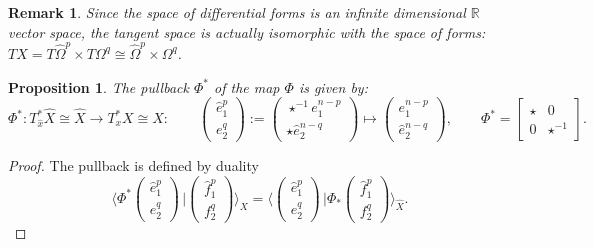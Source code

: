 \documentclass{elsarticle}
\newcommand{\revTwo}[1]{{\color{black}#1}}
\newtheorem{remark}{Remark}
\newtheorem{proposition}{Proposition}
\newcommand{\bbR}{\mathbb{R}}
\newcommand*{\dual}[1]{\ensuremath{\widehat{#1}}}
\newcommand{\dualpr}[3][]{\ensuremath{\langle #2 \, \vert #3 \rangle_{#1}}}
\begin{document}
\begin{remark}
Since the space of differential forms is an infinite dimensional $\bbR$ vector space, the tangent space  is actually isomorphic with the space of forms: $TX = T\dual{\Omega}^p \times T\Omega^q \cong \dual{\Omega}^p \times \Omega^q$. 
\end{remark}
\revTwo{
\begin{proposition}\label{pr:pullback_phi}
The pullback $\Phi^*$ of the map $\Phi$ is given by:
\begin{equation}
\label{eq:pullback_phi}
\Phi^*: T^*_{\dual{x}} \dual{X} \cong \dual{X} \rightarrow T^*_x X \cong X: \qquad
\begin{pmatrix}
    \dual{e}_1^{p}\\
    {e}^{q}_2
\end{pmatrix} :=
 \begin{pmatrix}
     \star^{-1} {e}^{n-p}_1 \\
     \star \dual{e}^{n-q}_2
 \end{pmatrix}
 \mapsto 
 \begin{pmatrix}
     {e}_1^{n-p} \\
     \dual{e}_2^{n-q}
 \end{pmatrix},  \qquad 
 \Phi^* = \begin{bmatrix}
        \star & 0 \\
        0 & \star^{-1}
    \end{bmatrix}.
\end{equation}
\end{proposition}
\begin{proof}
The pullback is defined by duality
\begin{equation}
    \dualpr[X]{\Phi^* 
    \begin{pmatrix}
      \dual{e}^p_1 \\ 
      {e}^q_2
    \end{pmatrix}
    }{\begin{pmatrix}
        \dual{f}^p_1\\
        f^q_2
    \end{pmatrix}
    } = \dualpr[\dual{X}]{\begin{pmatrix}
      \dual{e}^p_1 \\ 
      {e}^q_2
    \end{pmatrix}}{\Phi_*\begin{pmatrix}
	\dual{f}^p_1 \\
	f^q_2
	\end{pmatrix}}.
\end{equation}

\end{proof}}
\end{document}
